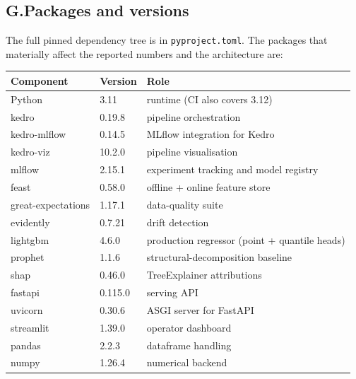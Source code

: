\documentclass[11pt,a4paper]{article}
\newcommand{\code}[1]{\texttt{\small #1}}
\begin{document}
\subsection*{G.\quad Packages and versions}
\label{app:packages}

The full pinned dependency tree is in \code{pyproject.toml}. The packages that materially affect the reported numbers and the architecture are:

\begin{table}[H]
\centering
\small
\begin{tabularx}{\linewidth}{@{}l l X@{}}
\toprule
\textbf{Component} & \textbf{Version} & \textbf{Role} \\
\midrule
Python                & 3.11                & runtime (CI also covers 3.12) \\
kedro                 & 0.19.8              & pipeline orchestration \\
kedro-mlflow          & 0.14.5              & MLflow integration for Kedro \\
kedro-viz             & 10.2.0              & pipeline visualisation \\
mlflow                & 2.15.1              & experiment tracking and model registry \\
feast                 & 0.58.0              & offline + online feature store \\
great-expectations    & 1.17.1              & data-quality suite \\
evidently             & 0.7.21              & drift detection \\
lightgbm              & 4.6.0               & production regressor (point + quantile heads) \\
prophet               & 1.1.6               & structural-decomposition baseline \\
shap                  & 0.46.0              & TreeExplainer attributions \\
fastapi               & 0.115.0             & serving API \\
uvicorn               & 0.30.6              & ASGI server for FastAPI \\
streamlit             & 1.39.0              & operator dashboard \\
pandas                & 2.2.3               & dataframe handling \\
numpy                 & 1.26.4              & numerical backend \\

\end{tabularx}
\end{table}
\end{document}
